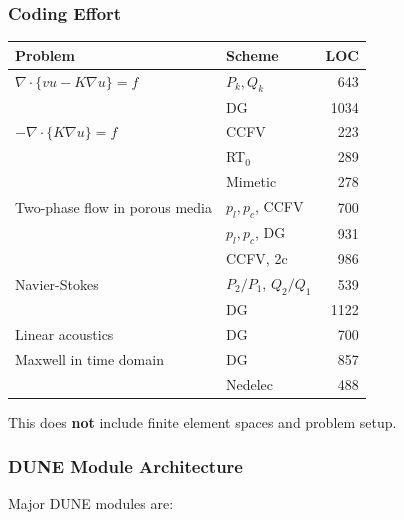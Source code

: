 \begin{frame}
\frametitle<presentation>{Coding Effort}
\begin{center}
\small\begin{tabular}{|p{}|p{}|r|}
\hline
Problem & Scheme & LOC \\
\hline
\hline
$\nabla\cdot\{v u - K\nabla u\}=f$ & $P_k, Q_k$ & 643 \\
 & DG & 1034 \\
\hline
$-\nabla\cdot\{K\nabla u\}=f$ & CCFV & 223 \\
 & RT$_0$ & 289 \\
 & Mimetic & 278 \\
\hline
Two-phase flow in porous media & $p_l, p_c$, CCFV & 700 \\
& $p_l, p_c$, DG & 931 \\  
& CCFV, 2c & 986 \\
\hline
Navier-Stokes & $P_2/P_1$, $Q_2/Q_1$ & 539 \\
           & DG & 1122 \\
\hline
Linear acoustics & DG & 700 \\
\hline
Maxwell in time domain & DG & 857 \\
 & Nedelec & 488 \\
\hline
\end{tabular}
\end{center}
This does \textbf{not} include finite element spaces and problem setup.
\end{frame}

\begin{frame}
\frametitle<presentation>{DUNE Module Architecture}
Major DUNE modules are:
\begin{center}
\end{center}
\end{frame}

